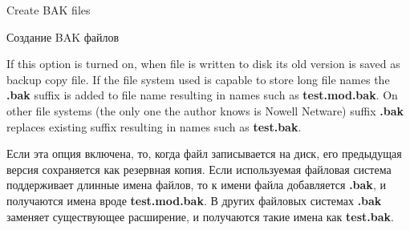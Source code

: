 \begin{popup}
\ifenglish
\caption{Create BAK files}
\else
\caption{Создание BAK файлов}
\fi
{}

\ifenglish
If this option is turned on, when file is written to disk its old version is saved
as backup copy file. If the file system used is capable to store long file names
the {\bf .bak} suffix is added to file name resulting in names such as {\bf test.mod.bak}.
On other file systems (the only one the author knows is Nowell Netware) suffix {\bf .bak}
replaces existing suffix resulting in names such as {\bf test.bak}.

\else
Если эта опция включена, то, когда файл записывается на диск, его предыдущая версия
сохраняется как резервная копия. Если используемая файловая система поддерживает
длинные имена файлов, то к имени файла добавляется {\bf .bak}, и получаются имена вроде
{\bf test.mod.bak}. В других файловых системах {\bf .bak} заменяет существующее
расширение, и получаются такие имена как {\bf test.bak}.
\fi
\end{popup}
